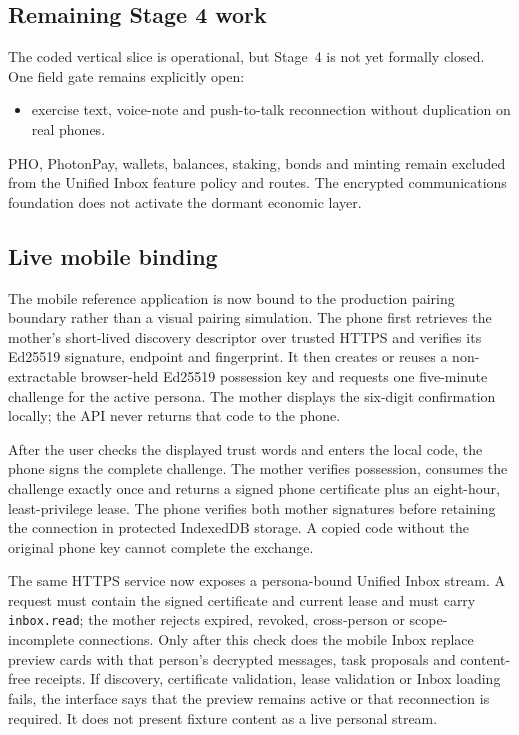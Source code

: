 \subsection{Remaining Stage 4 work}

The coded vertical slice is operational, but Stage~4 is not yet formally closed.  One field gate
remains explicitly open:
\begin{itemize}
  \item exercise text, voice-note and push-to-talk reconnection without duplication on real phones.
\end{itemize}

PHO, PhotonPay, wallets, balances, staking, bonds and minting remain excluded from the Unified
Inbox feature policy and routes.  The encrypted communications foundation does not activate the
dormant economic layer.

\subsection{Live mobile binding}

The mobile reference application is now bound to the production pairing boundary rather than a
visual pairing simulation.  The phone first retrieves the mother's short-lived discovery
descriptor over trusted HTTPS and verifies its Ed25519 signature, endpoint and fingerprint.  It
then creates or reuses a non-extractable browser-held Ed25519 possession key and requests one
five-minute challenge for the active persona.  The mother displays the six-digit confirmation
locally; the API never returns that code to the phone.

After the user checks the displayed trust words and enters the local code, the phone signs the
complete challenge.  The mother verifies possession, consumes the challenge exactly once and
returns a signed phone certificate plus an eight-hour, least-privilege lease.  The phone verifies
both mother signatures before retaining the connection in protected IndexedDB storage.  A copied
code without the original phone key cannot complete the exchange.

The same HTTPS service now exposes a persona-bound Unified Inbox stream.  A request must contain
the signed certificate and current lease and must carry \texttt{inbox.read}; the mother rejects
expired, revoked, cross-person or scope-incomplete connections.  Only after this check does the
mobile Inbox replace preview cards with that person's decrypted messages, task proposals and
content-free receipts.  If discovery, certificate validation, lease validation or Inbox loading
fails, the interface says that the preview remains active or that reconnection is required.  It
does not present fixture content as a live personal stream.

